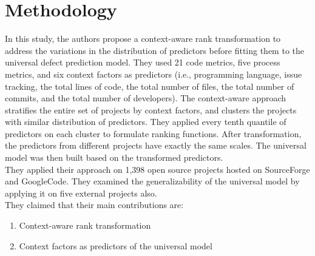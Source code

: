 \section{Methodology}
In this study, the authors propose a context-aware rank transformation to address the variations in the distribution of predictors before fitting them to the universal defect prediction model. They used 21 code metrics, five process metrics, and six context factors as predictors (i.e., programming language, issue tracking, the total lines of code, the total number of files, the total number of commits, and the total number of developers). The context-aware approach stratifies the entire set of projects by context factors, and clusters the
projects with similar distribution of predictors. They applied every tenth quantile of predictors on each cluster to formulate ranking functions. After transformation, the predictors from different projects have exactly the same scales. The universal model was then built based on the transformed predictors.\\
They applied their approach on 1,398 open source projects hosted on SourceForge and GoogleCode. They examined the generalizability of the universal model
by applying it on five external projects also.\\
They claimed that their main contributions are:

\begin{enumerate}
\bf\item Context-aware rank transformation

\bf\item Context factors as predictors of the universal model
\end{enumerate}


